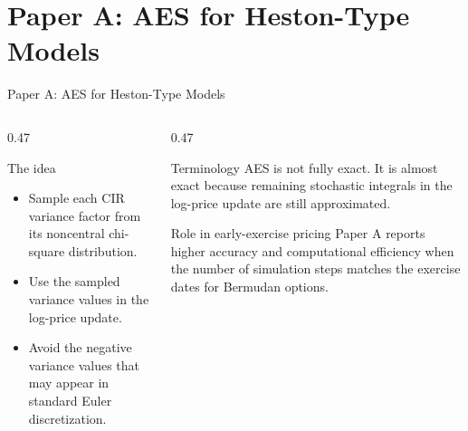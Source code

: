 \section{Paper A: AES for Heston-Type Models}

\begin{frame}{Paper A: AES for Heston-Type Models}

  \vspace{0.5em}
  \begin{columns}[T,onlytextwidth]
    \begin{column}{0.47\textwidth}
      \begin{block}{The idea}
        \begin{itemize}
          \item Sample each CIR variance factor from its noncentral chi-square distribution.
          \item Use the sampled variance values in the log-price update.
          \item Avoid the negative variance values that may appear in standard Euler discretization.
        \end{itemize}
      \end{block}
    \end{column}
    \begin{column}{0.47\textwidth}
      \begin{block}{Terminology}
        AES is not fully exact. It is almost exact because remaining stochastic integrals in the log-price update are still approximated.
      \end{block}
      \begin{block}{Role in early-exercise pricing}
        Paper A reports higher accuracy and computational efficiency when the number of simulation steps matches the exercise dates for Bermudan options.
      \end{block}
    \end{column}
  \end{columns}
\end{frame}


